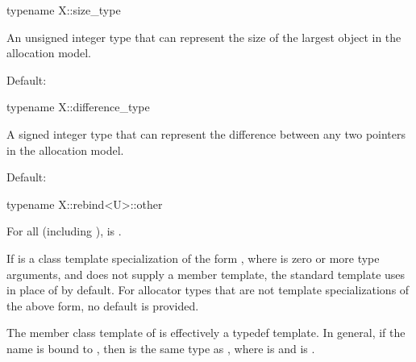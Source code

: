 \begin{itemdecl}
typename X::size_type
\end{itemdecl}

\begin{itemdescr}
\pnum
\result
An unsigned integer type
that can represent the size of the largest object in the allocation model.

\pnum
\remarks
Default:
\end{itemdescr}

\begin{itemdecl}
typename X::difference_type
\end{itemdecl}

\begin{itemdescr}
\pnum
\result
A signed integer type that can represent
the difference between any two pointers in the allocation model.

\pnum
\remarks
Default:
\end{itemdescr}

\begin{itemdecl}
typename X::rebind<U>::other
\end{itemdecl}

\begin{itemdescr}
\pnum
\result
{}

\pnum
\ensures
For all  (including ),
 is .

\pnum
\remarks
If  is a class template specialization of the form
, where  is zero or more type
arguments, and  does not supply a  member
template, the standard  template uses
 in place of 
by default. For allocator types that are not template specializations of the
above form, no default is provided.

\pnum
\begin{note}
The member class template  of  is
effectively a typedef template.
In general, if
the name  is bound to , then
 is the same type as
, where
 is  and
 is .
\end{note}
\end{itemdescr}

